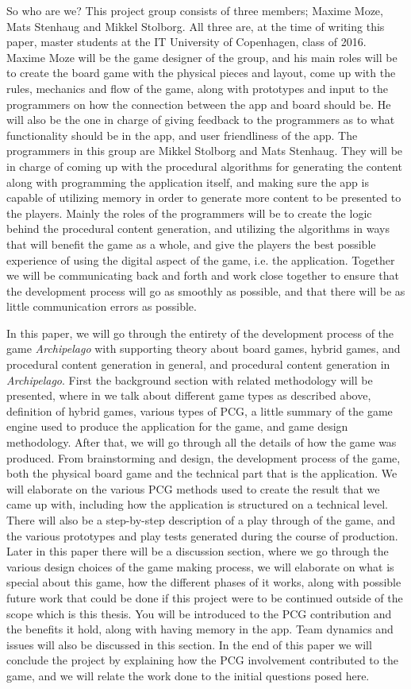 So who are we? This project group consists of three members; Maxime Moze, Mats Stenhaug and Mikkel Stolborg. All three are, at the time of writing this paper, master students at the IT University of Copenhagen, class of 2016. Maxime Moze will be the game designer of the group, and his main roles will be to create the board game with the physical pieces and layout, come up with the rules, mechanics and flow of the game, along with prototypes and input to the programmers on how the connection between the app and board should be. He will also be the one in charge of giving feedback to the programmers as to what functionality should be in the app, and user friendliness of the app.
The programmers in this group are Mikkel Stolborg and Mats Stenhaug. They will be in charge of coming up with the procedural algorithms for generating the content along with programming the application itself, and making sure the app is capable of utilizing memory in order to generate more content to be presented to the players. Mainly the roles of the programmers will be to create the logic behind the procedural content generation, and utilizing the algorithms in ways that will benefit the game as a whole, and give the players the best possible experience of using the digital aspect of the game, i.e. the application.
Together we will be communicating back and forth and work close together to ensure that the development process will go as smoothly as possible, and that there will be as little communication errors as possible.


In this paper, we will go through the entirety of the development process of the game \textit{Archipelago} with supporting theory about board games, hybrid games, and procedural content generation in general, and procedural content generation in \textit{Archipelago}. First the background section with related methodology will be presented, where in we talk about different game types as described above, definition of hybrid games, various types of PCG, a little summary of the game engine used to produce the application for the game, and game design methodology.
After that, we will go through all the details of how the game was produced. From brainstorming and design, the development process of the game, both the physical board game and the technical part that is the application. We will elaborate on the various PCG methods used to create the result that we came up with, including how the application is structured on a technical level. There will also be a step-by-step description of a play through of the game, and the various prototypes and play tests generated during the course of production.
Later in this paper there will be a discussion section, where we go through the various design choices of the game making process, we will elaborate on what is special about this game, how the different phases of it works, along with possible future work that could be done if this project were to be continued outside of the scope which is this thesis. You will be introduced to the PCG contribution and the benefits it hold, along with having memory in the app. Team dynamics and issues will also be discussed in this section.
In the end of this paper we will conclude the project by explaining how the PCG involvement contributed to the game, and we will relate the work done to the initial questions posed here.